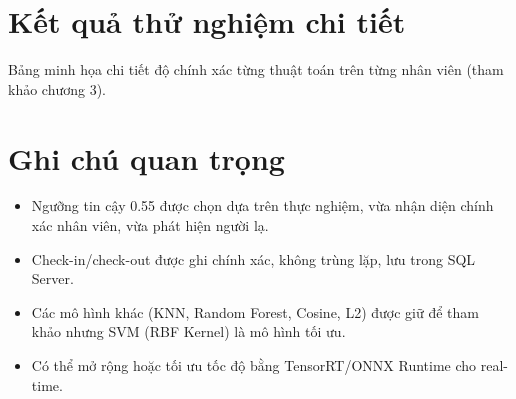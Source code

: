 \documentclass[a4paper]{book}
\begin{document}
\section{Kết quả thử nghiệm chi tiết}
Bảng minh họa chi tiết độ chính xác từng thuật toán trên từng nhân viên (tham khảo chương 3).

\section{Ghi chú quan trọng}
\begin{itemize}
    \item Ngưỡng tin cậy 0.55 được chọn dựa trên thực nghiệm, vừa nhận diện chính xác nhân viên, vừa phát hiện người lạ.
    \item Check-in/check-out được ghi chính xác, không trùng lặp, lưu trong SQL Server.
    \item Các mô hình khác (KNN, Random Forest, Cosine, L2) được giữ để tham khảo nhưng SVM (RBF Kernel) là mô hình tối ưu.
    \item Có thể mở rộng hoặc tối ưu tốc độ bằng TensorRT/ONNX Runtime cho real-time.
\end{itemize}
\end{document}
